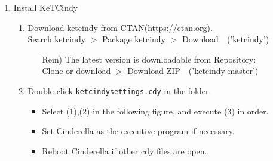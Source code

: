 \documentclass{article}
\begin{document}
\begin{enumerate}[\bf\large 1.]
\item Install KeTCindy
  \begin{enumerate}[(1)]
  \item Download ketcindy from CTAN(\url{https://ctan.org}).\\
  \hspace*{10mm}Search ketcindy $>$ Pack­age ketcindy $>$ Download\ \ ('ketcindy')
    \begin{itemize}
    \item[Rem)]The latest version is downloadable from Repository:\\
         \hspace*{5mm}Clone or download $>$ Download ZIP\ \ ('ketcindy-master')
    \end{itemize}
  \item Double click \verb|ketcindysettings.cdy| in the folder.
    \begin{itemize}
   \item  Select (1),(2) in the following figure, and execute (3) in order.
    \item Set Cinderella as the executive program if necessary.
    \item Reboot Cinderella if other cdy files are open.
   \end{itemize}
  \end{enumerate}

\vspace{2mm}


\end{enumerate}
\end{document}
